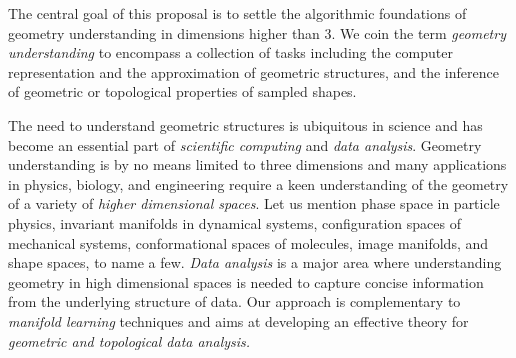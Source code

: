 The central goal of this proposal is to settle the algorithmic
foundations of geometry understanding in dimensions higher than 3.  We
coin the term {\em geometry understanding} to encompass a collection
of tasks including the computer representation and the approximation
of geometric structures, and the inference of geometric or topological
properties of sampled
shapes.  %

The need to understand geometric structures is ubiquitous in science
and has become an essential part of {\em scientific computing} and
{\em data analysis}. %
Geometry understanding is by no means limited to
three dimensions and many applications in physics, biology, and
engineering require a keen understanding of the geometry of a variety
of {\em higher dimensional spaces}. Let us mention phase space in particle
physics, invariant manifolds in dynamical systems, configuration
spaces of mechanical systems, conformational spaces of molecules,
image manifolds, and shape spaces, to name a few.  {\em Data
  analysis} is a major area where understanding
geometry in high dimensional spaces is  needed to
 capture concise information from the underlying structure of
 data. Our approach is complementary to {\em manifold learning}
 techniques and aims at  developing an effective theory for {\em geometric and
 topological data analysis.}

